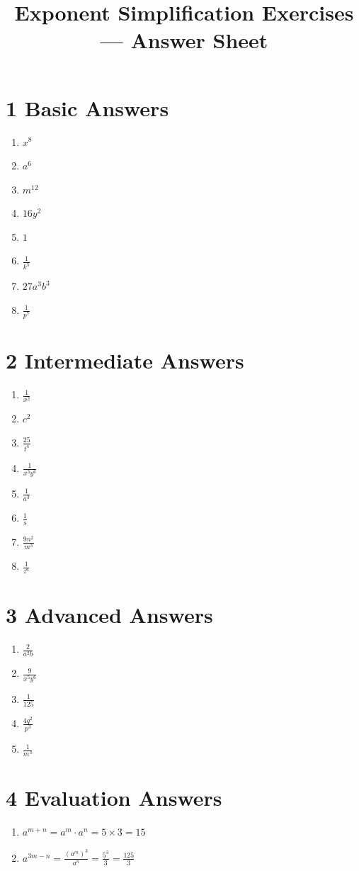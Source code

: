 \documentclass[12pt,a4paper,]{article}
\title{Exponent Simplification Exercises — Answer Sheet}
\author{}
\date{}
\begin{document}
	\maketitle
	\section{1 Basic Answers}
	\begin{enumerate}
		\item \(x^{8}\)
		\item \(a^{6}\)
		\item \(m^{12}\)
		\item \(16 y^{2}\)
		\item \(1\)
		\item \(\frac{1}{k^{5}}\)
		\item \(27 a^{3} b^{3}\)
		\item \(\frac{1}{p^{7}}\)
	\end{enumerate}
	
	\section{2 Intermediate Answers}
	\begin{enumerate}
		\item \(\frac{1}{x^{2}}\)
		\item \(c^{2}\)
		\item \(\frac{25}{t^{4}}\)
		\item \(\frac{1}{x^{3} y^{6}}\)
		\item \(\frac{1}{a^{3}}\)
		\item \(\frac{1}{s}\)
		\item \(\frac{9 n^{2}}{m^{3}}\)
		\item \(\frac{1}{z^{6}}\)
	\end{enumerate}
	
	\section{3 Advanced Answers}
	\begin{enumerate}
		\item \(\frac{2}{a^{2} b}\)
		\item \(\frac{9}{x^{5} y^{6}}\)
		\item \(\frac{1}{125}\)
		\item \(\frac{4 q^{2}}{p^{3}}\)
		\item \(\frac{1}{m^{3}}\)
	\end{enumerate}
	
	\section{4 Evaluation Answers}
	\begin{enumerate}
		\item \(a^{m+n}=a^{m} \cdot a^{n}=5 \times 3=15\)
		\item \(a^{3 m-n}=\frac{\left(a^{m}\right)^{3}}{a^{n}}=\frac{5^{3}}{3}=\frac{125}{3}\)
	\end{enumerate}
	
\end{document}
